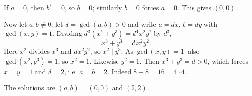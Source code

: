 If $a=0$, then $b^3=0$, so $b=0$; similarly $b=0$ forces $a=0$. This gives $(0,0)$.

Now let $a,b\ne0$, let $d=\gcd(a,b)>0$ and write $a=dx$, $b=dy$ with $\gcd(x,y)=1$. Dividing $d^3\left(x^3+y^3\right)=d^4x^2y^2$ by $d^3$,
\[x^3+y^3=d\,x^2y^2.\]
Here $x^2$ divides $x^3$ and $dx^2y^2$, so $x^2\mid y^3$. As $\gcd(x,y)=1$, also $\gcd\left(x^2,y^3\right)=1$, so $x^2=1$. Likewise $y^2=1$. Then $x^3+y^3=d>0$, which forces $x=y=1$ and $d=2$, i.e. $a=b=2$. Indeed $8+8=16=4\cdot4$.

The solutions are $\boxed{(a,b)=(0,0)\text{ and }(2,2)}$.
